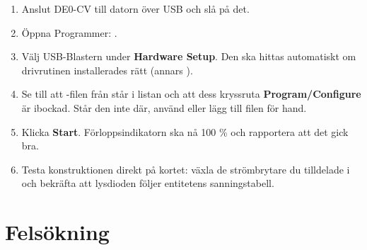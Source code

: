 \begin{enumerate}
  \item Anslut DE0-CV till datorn över USB och slå på det.
  \item Öppna Programmer: .
  \item Välj USB-Blastern under \textbf{Hardware Setup}. Den ska hittas automatiskt om drivrutinen
    installerades rätt (annars ).
  \item Se till att -filen från  står i listan och att dess
    kryssruta \textbf{Program/Configure} är ibockad. Står den inte där, använd 
    eller lägg till filen för hand.
  \item Klicka \textbf{Start}. Förloppsindikatorn ska nå 100 \% och rapportera att det gick bra.
  \item Testa konstruktionen direkt på kortet: växla de strömbrytare du tilldelade i
     och bekräfta att lysdioden följer entitetens sanningstabell.
\end{enumerate}

\section{Felsökning}
\label{app:quartus:trouble}

